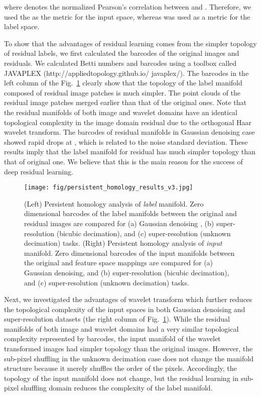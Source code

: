 \documentclass[10pt,twocolumn,letterpaper]{article}
\begin{document}
where  denotes the normalized Pearson's correlation between  and .
Therefore, we used the  as the metric for the input space, whereas  was used as a metric for the label space.


To show that the advantages of residual learning comes from the simpler topology of residual labels,
we first calculated the barcodes of the original images and residuals. 
We calculated Betti numbers and barcodes using a toolbox called JAVAPLEX (http://appliedtopology.github.io/ javaplex/). 
The barcodes in the left column of the Fig.~\ref{fig:ori_resid} clearly show that
the topology of the label manifold composed of residual image patches is much simpler. The point clouds of the residual image patches merged earlier than that of the original ones.
Note that the residual manifolds of both image and wavelet domains have an identical topological complexity in the image domain residual due to the orthogonal Haar wavelet transform.
 The barcodes of residual manifolds in Gaussian denoising case showed rapid drops at , which is related to the noise standard deviation.
These results imply that the label manifold for residual  has much simpler topology than that of original one.
We believe that this is the main 
reason for the success of deep residual learning.


\begin{figure}[!hbt]
\centerline{\texttt{[image: fig/persistent\_homology\_results\_v3.jpg]}}
\caption{ (Left) Persistent homology analysis of {\em label} manifold. Zero dimensional barcodes of the label manifolds between the original and residual images are compared for (a) Gaussian denoising , (b) super-resolution (bicubic decimation), and (c) super-resolution (unknown decimation) tasks. 
(Right)  Persistent homology analysis of {\em input} manifold. Zero dimensional barcodes of the input manifolds between the original and feature space mappings are compared for (a) Gaussian denoising, and (b) super-resolution (bicubic decimation),  and (c) super-resolution (unknown decimation) tasks. }
\label{fig:ori_resid}
\end{figure}


Next, we investigated the advantages of wavelet transform which further reduces the topological complexity of the input spaces in both Gaussian denoising and super-resolution datasets (the right column of Fig.~\ref{fig:ori_resid}). While the residual manifolds of both image and wavelet domains had a very similar topological complexity represented by barcodes, the input manifold of the wavelet transformed images had simpler topology than the original images. 
However, the sub-pixel shuffling in the unknown decimation case does not change the 
manifold structure because it  merely shuffles the order of the pixels. Accordingly,  the topology of the input manifold does not change, but  the residual learning in sub-pixel shuffling domain reduces the complexity
of the label manifold.
\end{document}
